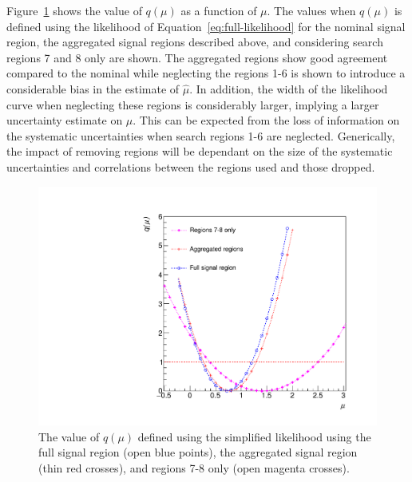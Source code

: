 Figure~\ref{fig:agg-likelihoodscan} shows the value of $q(\mu)$ as a function of $\mu$. The values when $q(\mu)$ 
is defined using the likelihood of Equation~\ref{eq:full-likelihood} for the nominal signal region, the aggregated signal
regions described above, and considering search regions 7 and 8 only are shown. The aggregated regions show
good agreement compared to the nominal while neglecting the regions 1-6 is shown to introduce a considerable
bias in the estimate of $\hat{\mu}$. In addition, the width of the likelihood curve when neglecting these regions is considerably
larger, implying a larger uncertainty estimate on $\mu$. This can be expected from the loss of information on
the systematic uncertainties when search regions 1-6 are neglected. Generically, the impact of removing regions
will be dependant on the size of the systematic uncertainties and correlations between the regions used and those
dropped.

\begin{figure}[hbt]
  \begin{center} 
   \includegraphics[width=1.5\cmsFigWidth]{figures/r_agg.pdf}
   \caption{The value of $q(\mu)$ defined using the simplified likelihood using the full signal region (open blue points), the aggregated signal region (thin red crosses),
   and regions 7-8 only (open magenta crosses).}
   \label{fig:agg-likelihoodscan} 
  \end{center}
\end{figure}
